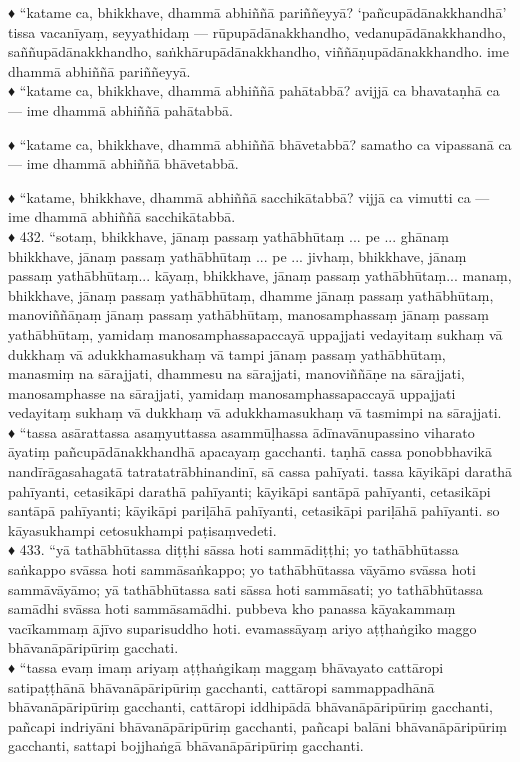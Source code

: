 \documentclass[11pt]{article}
\begin{document}
♦ “katame ca, bhikkhave, dhammā abhiññā pariññeyyā? ‘pañcupādānakkhandhā’ tissa vacanīyaṃ, seyyathidaṃ — rūpupādānakkhandho, vedanupādānakkhandho, saññupādānakkhandho, saṅkhārupādānakkhandho, viññāṇupādānakkhandho. ime dhammā abhiññā pariññeyyā.\\

♦ “katame ca, bhikkhave, dhammā abhiññā pahātabbā? avijjā ca bhavataṇhā ca — ime dhammā abhiññā pahātabbā.\

♦ “katame ca, bhikkhave, dhammā abhiññā bhāvetabbā? samatho ca vipassanā ca — ime dhammā abhiññā bhāvetabbā.\

♦ “katame, bhikkhave, dhammā abhiññā sacchikātabbā? vijjā ca vimutti ca — ime dhammā abhiññā sacchikātabbā.\\

♦ 432. “sotaṃ, bhikkhave, jānaṃ passaṃ yathābhūtaṃ ... pe ... ghānaṃ bhikkhave, jānaṃ passaṃ yathābhūtaṃ ... pe ... jivhaṃ, bhikkhave, jānaṃ passaṃ yathābhūtaṃ... kāyaṃ, bhikkhave, jānaṃ passaṃ yathābhūtaṃ... manaṃ, bhikkhave, jānaṃ passaṃ yathābhūtaṃ, dhamme jānaṃ passaṃ yathābhūtaṃ, manoviññāṇaṃ jānaṃ passaṃ yathābhūtaṃ, manosamphassaṃ jānaṃ passaṃ yathābhūtaṃ, yamidaṃ manosamphassapaccayā uppajjati vedayitaṃ sukhaṃ vā dukkhaṃ vā adukkhamasukhaṃ vā tampi jānaṃ passaṃ yathābhūtaṃ, manasmiṃ na sārajjati, dhammesu na sārajjati, manoviññāṇe na sārajjati, manosamphasse na sārajjati, yamidaṃ manosamphassapaccayā uppajjati vedayitaṃ sukhaṃ vā dukkhaṃ vā adukkhamasukhaṃ vā tasmimpi na sārajjati.\\

♦ “tassa asārattassa asaṃyuttassa asammūḷhassa ādīnavānupassino viharato āyatiṃ pañcupādānakkhandhā apacayaṃ gacchanti. taṇhā cassa ponobbhavikā nandīrāgasahagatā tatratatrābhinandinī, sā cassa pahīyati. tassa kāyikāpi darathā pahīyanti, cetasikāpi darathā pahīyanti; kāyikāpi santāpā pahīyanti, cetasikāpi santāpā pahīyanti; kāyikāpi pariḷāhā pahīyanti, cetasikāpi pariḷāhā pahīyanti. so kāyasukhampi cetosukhampi paṭisaṃvedeti.\\

♦ 433. “yā tathābhūtassa diṭṭhi sāssa hoti sammādiṭṭhi; yo tathābhūtassa saṅkappo svāssa hoti sammāsaṅkappo; yo tathābhūtassa vāyāmo svāssa hoti sammāvāyāmo; yā tathābhūtassa sati sāssa hoti sammāsati; yo tathābhūtassa samādhi svāssa hoti sammāsamādhi. pubbeva kho panassa kāyakammaṃ vacīkammaṃ ājīvo suparisuddho hoti. evamassāyaṃ ariyo aṭṭhaṅgiko maggo bhāvanāpāripūriṃ gacchati.\\

♦ “tassa evaṃ imaṃ ariyaṃ aṭṭhaṅgikaṃ maggaṃ bhāvayato cattāropi satipaṭṭhānā bhāvanāpāripūriṃ gacchanti, cattāropi sammappadhānā bhāvanāpāripūriṃ gacchanti, cattāropi iddhipādā bhāvanāpāripūriṃ gacchanti, pañcapi indriyāni bhāvanāpāripūriṃ gacchanti, pañcapi balāni bhāvanāpāripūriṃ gacchanti, sattapi bojjhaṅgā bhāvanāpāripūriṃ gacchanti.\\
\end{document}

